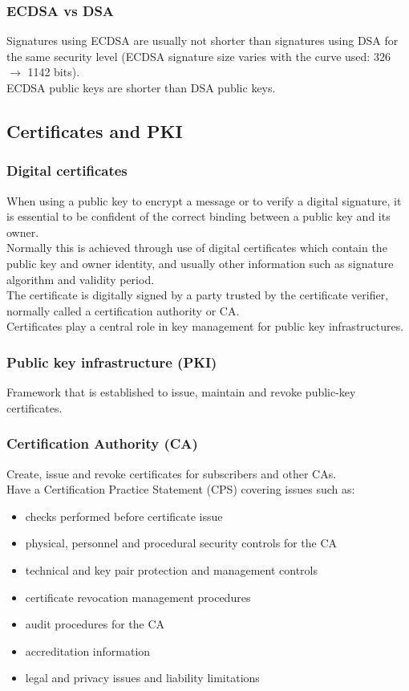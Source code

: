 \documentclass{article}
\begin{document}
\subsubsection{ECDSA vs DSA}

Signatures using ECDSA are usually not shorter than signatures using DSA for the same security level (ECDSA signature size varies with the curve used: 326 $\rightarrow$ 1142 bits).\\
ECDSA public keys are shorter than DSA public keys.

\subsection{Certificates and PKI}

\subsubsection{Digital certificates}

When using a public key to encrypt a message or to verify a digital signature, it is essential to be confident of the correct binding between a public key and its owner.\\
Normally this is achieved through use of digital certificates which contain the public key and owner identity, and usually other information such as signature algorithm and validity period.\\
The certificate is digitally signed by a party trusted by the certificate verifier, normally called a certification authority or CA.\\
Certificates play a central role in key management for public key infrastructures.

\subsubsection{Public key infrastructure (PKI)}

Framework that is established to issue, maintain and revoke public-key certificates.

\subsubsection{Certification Authority (CA)}

Create, issue and revoke certificates for subscribers and other CAs.\\
Have a Certification Practice Statement (CPS) covering issues such as:
\begin{itemize}
    \item checks performed before certificate issue
    \item physical, personnel and procedural security controls for the CA
    \item technical and key pair protection and management controls
    \item certificate revocation management procedures
    \item audit procedures for the CA
    \item accreditation information
    \item legal and privacy issues and liability limitations
\end{itemize}
\end{document}
